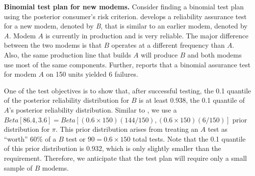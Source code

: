 \documentclass {book}
\begin{document}
\begin{sidebar}\label{ch10:ex1} {\bf Binomial test plan for new modems.}
Consider finding a binomial test plan  using the posterior consumer's risk criterion.
\citet{H90} develops a reliability assurance test for a new modem,
denoted by \emph{B}, that is similar to an earlier modem, denoted
by \emph{A}. Modem $A$ is currently in production and is very
reliable. The major difference between the two modems is that $B$
operates at a different frequency than $A$. Also, the same
production line that builds $A$ will produce $B$ and both modems
use most of the same components. Further, \citet{H90} reports that
a binomial assurance test for modem $A$ on 150 units yielded 6
failures.

One of the test objectives is to show that, after successful
testing, the 0.1 quantile of the posterior reliability
distribution for $B$ is at least 0.938, the 0.1 quantile of $A$'s
posterior reliability distribution. Similar to \citet{H90}, we use
a $Beta[86.4, 3.6]=Beta[(0.6 \times 150)(144/150), (0.6 \times
150)(6/150)]$ prior distribution for $\pi$. This prior
distribution arises from treating an $A$ test as ``worth'' 60\% of
a $B$ test or $90=0.6 \times 150$ total tests. Note that the 0.1
quantile of this prior distribution is 0.932, which is only
slightly smaller than the requirement. Therefore, we anticipate
that the test plan will require only a small sample of $B$ modems.



\end{sidebar}
\end{document}
